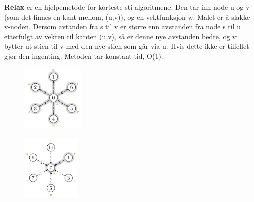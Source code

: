 \documentclass[12pt]{report}
\begin{document}

\par

\textbf{Relax} er en hjelpemetode for korteste-sti-algoritmene. Den tar inn node u og v (som det finnes en kant mellom, (u,v)), og en vektfunksjon w. Målet er å slakke v-noden. Dersom avtanden fra s til v er større enn avstanden fra node s til u etterfulgt av vekten til kanten (u,v), så er denne nye avstanden bedre, og vi bytter ut stien til v med den nye stien som går via u. Hvis dette ikke er tilfellet gjør den ingenting. Metoden tar konstant tid, O(1).\par


\vspace{\baselineskip}

\vspace{\baselineskip}
\begin{multicols}{2}



\begin{figure}[H]
	\begin{Center}
		\includegraphics[width=1.19in,height=1.25in]{./media/image125.png}
	\end{Center}
\end{figure}



\par




\begin{figure}[H]
	\begin{Center}
		\includegraphics[width=1.1in,height=1.25in]{./media/image126.png}
	\end{Center}
\end{figure}



\par


\vspace{\baselineskip}

\end{multicols}
\end{document}
